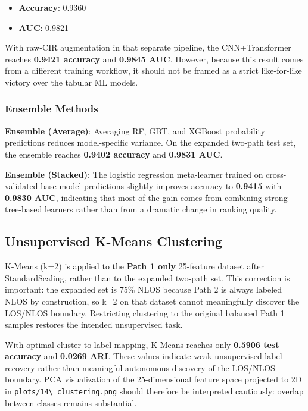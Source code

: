 \documentclass[12pt,a4paper]{article}
\newcommand{\passthrough}[1]{#1}
\providecommand{\passthrough}[1]{#1}
\providecommand{\tightlist}{%
  \setlength{\itemsep}{0pt}\setlength{\parskip}{0pt}}
\begin{document}
\begin{itemize}
\tightlist
\item
  \textbf{Accuracy}: 0.9360
\item
  \textbf{AUC}: 0.9821
\end{itemize}

With raw-CIR augmentation in that separate pipeline, the CNN+Transformer
reaches \textbf{0.9421 accuracy} and \textbf{0.9845 AUC}. However,
because this result comes from a different training workflow, it should
not be framed as a strict like-for-like victory over the tabular ML
models.

\subsubsection{Ensemble Methods}\label{ensemble-methods-1}

\textbf{Ensemble (Average)}: Averaging RF, GBT, and XGBoost probability
predictions reduces model-specific variance. On the expanded two-path
test set, the ensemble reaches \textbf{0.9402 accuracy} and
\textbf{0.9831 AUC}.

\textbf{Ensemble (Stacked)}: The logistic regression meta-learner
trained on cross-validated base-model predictions slightly improves
accuracy to \textbf{0.9415} with \textbf{0.9830 AUC}, indicating that
most of the gain comes from combining strong tree-based learners rather
than from a dramatic change in ranking quality.

\subsection{Unsupervised K-Means
Clustering}\label{unsupervised-k-means-clustering}

K-Means (k=2) is applied to the \textbf{Path 1 only} 25-feature dataset
after StandardScaling, rather than to the expanded two-path set. This
correction is important: the expanded set is 75\% NLOS because Path 2 is
always labeled NLOS by construction, so k=2 on that dataset cannot
meaningfully discover the LOS/NLOS boundary. Restricting clustering to
the original balanced Path 1 samples restores the intended unsupervised
task.

With optimal cluster-to-label mapping, K-Means reaches only
\textbf{0.5906 test accuracy} and \textbf{0.0269 ARI}. These values
indicate weak unsupervised label recovery rather than meaningful
autonomous discovery of the LOS/NLOS boundary. PCA visualization of the
25-dimensional feature space projected to 2D in
\passthrough{\lstinline!plots/14\_clustering.png!} should therefore be
interpreted cautiously: overlap between classes remains substantial.
\end{document}
